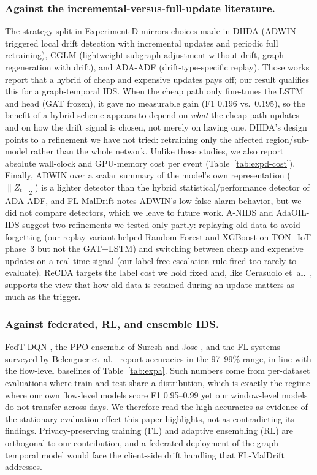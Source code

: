 \documentclass[twocolumn]{llncs}
\begin{document}
\subsubsection{Against the incremental-versus-full-update literature.} The strategy split in
Experiment D mirrors choices made in DHDA \cite{xiang2026dhda} (ADWIN-triggered local drift
detection with incremental updates and periodic full retraining), CGLM \cite{zhou2025cglm}
(lightweight subgraph adjustment without drift, graph regeneration with drift), and ADA-ADF
\cite{li2025adaadf} (drift-type-specific replay). Those works report that a hybrid of cheap and
expensive updates pays off; our result qualifies this for a graph-temporal IDS. When the cheap path
only fine-tunes the LSTM and head (GAT frozen), it gave no measurable gain (F1 0.196 vs.\ 0.195), so
the benefit of a hybrid scheme appears to depend on \emph{what} the cheap path updates and on how
the drift signal is chosen, not merely on having one. DHDA's design points to a refinement we have
not tried: retraining only the affected region/sub-model rather than the whole network. Unlike
these studies, we also report absolute wall-clock and GPU-memory cost per event (Table~\ref{tab:expd-cost}).
Finally, ADWIN over a scalar summary of the model's own representation ($\|Z_t\|_2$) is
a lighter detector than the hybrid statistical/performance detector of ADA-ADF, and FL-MalDrift
\cite{patel2026fmaldrift} notes ADWIN's low false-alarm behavior, but we did not compare
detectors, which we leave to future work. A-NIDS \cite{zha2025anids} and AdaOIL-IDS \cite{lu2025adaoil} suggest two refinements we tested only partly: replaying old data to avoid forgetting (our replay variant helped Random Forest and XGBoost on TON\_IoT phase~3 but not the GAT+LSTM) and switching between cheap and expensive updates on a real-time signal (our label-free escalation rule fired too rarely to evaluate). ReCDA \cite{yang2025recda} targets the label cost we hold fixed and, like Cerasuolo et~al.\ \cite{cerasuolo2025adaptable}, supports the view that how old data is retained during an update matters as much as the trigger.

\subsubsection{Against federated, RL, and ensemble IDS.} FedT-DQN \cite{ma2025fedtdqn}, the PPO
ensemble of Suresh and Jose \cite{suresh2025ppo}, and the FL systems surveyed by Belenguer
et~al.\ \cite{belenguer2025flreview} report accuracies in the 97--99\% range, in line with the
flow-level baselines of Table~\ref{tab:expa}. Such numbers come from per-dataset evaluations where
train and test share a distribution, which is exactly the regime where our own flow-level models
score F1 0.95--0.99 yet our window-level models do not transfer across days. We therefore read the
high accuracies as evidence of the stationary-evaluation effect this paper highlights, not as
contradicting its findings. Privacy-preserving training (FL) and adaptive ensembling (RL) are
orthogonal to our contribution, and a federated deployment of the graph-temporal model would face
the client-side drift handling that FL-MalDrift addresses.
\end{document}
